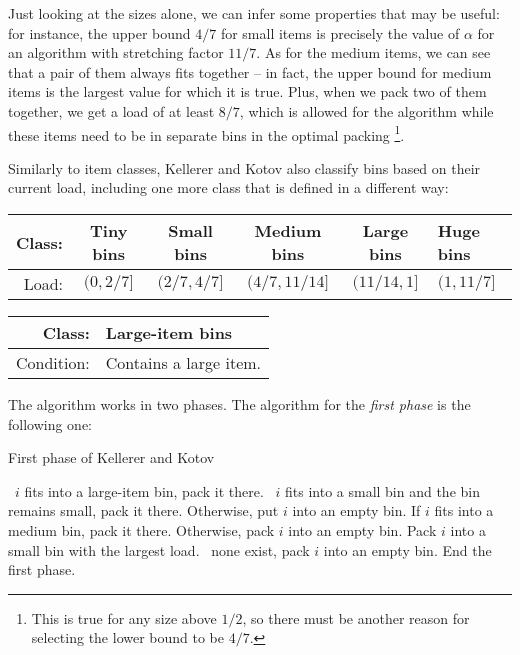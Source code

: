 Just looking at the sizes alone, we can infer some properties that may
be useful: for instance, the upper bound $4/7$ for small items is
precisely the value of $\alpha$ for an algorithm with stretching
factor $11/7$. As for the medium items, we can see that a pair of them
always fits together -- in fact, the upper bound for medium items is
the largest value for which it is true. Plus, when we pack two of them
together, we get a load of at least $8/7$, which is allowed for the
algorithm while these items need to be in separate bins in the optimal
packing \footnote{This is true for any size above $1/2$, so there must be
another reason for selecting the lower bound to be $4/7$.}.

Similarly to item classes, Kellerer and Kotov also classify bins based
on their current load, including one more class that is defined in a
different way:

\begin{center}
  \begin{tabular}{ r | c | c | c | c | l }
    Class: & Tiny bins & Small bins & Medium bins & Large bins & Huge bins \\ \hline
    Load:  & $(0,2/7]$ & $(2/7, 4/7]$ & $(4/7, 11/14]$ & $(11/14,1]$ & $(1,11/7]$ \\ 
  \end{tabular}
\end{center}

\begin{center}
  \begin{tabular}{ r | l }
    Class: & Large-item bins \\ \hline
    Condition: & Contains a large item. \\ 
  \end{tabular}
\end{center}


The algorithm works in two phases. The algorithm for the \emph{first phase} is the following
one:

\begin{algorithm}
\caption{First phase of Kellerer and Kotov}
\begin{algorithmic}[1]
\State \algorithmicif\ $i$ fits into a large-item bin, pack it there.
\State \algorithmicif\ $i$ fits into a small bin and the bin remains small, pack it there.
\State Otherwise, put $i$ into an empty bin.
\EndIf
{}
\State If $i$ fits into a medium bin, pack it there.
\State Otherwise, pack $i$ into an empty bin.
\EndIf
{}
\State Pack $i$ into a small bin with the largest load.
\State \algorithmicif\ none exist, pack $i$ into an empty bin.
\EndIf
{}
\State End the first phase.
\EndIf
\EndFor 
\end{algorithmic}
\end{algorithm}

